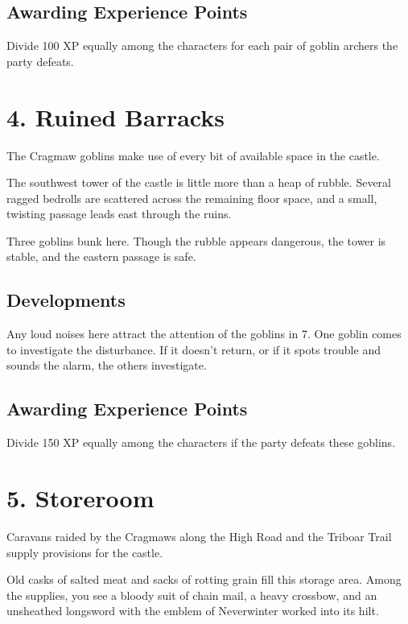\documentclass[10pt,a4paper,twoside,bg=print,twocolumn,openany,nodeprecatedcode]{dndbook}
\begin{document}
\subsection{Awarding Experience Points}
Divide 100 XP equally among the characters for each pair of goblin archers the party defeats.

\section{4. Ruined Barracks}
The Cragmaw goblins make use of every bit of available space in the castle.

\begin{DndReadAloud}{}
The southwest tower of the castle is little more than a heap of rubble. Several ragged bedrolls are scattered across the remaining floor space, and a small, twisting passage leads east through the ruins.

\end{DndReadAloud}

Three goblins bunk here. Though the rubble appears dangerous, the tower is stable, and the eastern passage is safe.

\subsection{Developments}
Any loud noises here attract the attention of the goblins in 7. One goblin comes to investigate the disturbance. If it doesn't return, or if it spots trouble and sounds the alarm, the others investigate.

\subsection{Awarding Experience Points}
Divide 150 XP equally among the characters if the party defeats these goblins.

\section{5. Storeroom}
Caravans raided by the Cragmaws along the High Road and the Triboar Trail supply provisions for the castle.

\begin{DndReadAloud}{}
Old casks of salted meat and sacks of rotting grain fill this storage area. Among the supplies, you see a bloody suit of chain mail, a heavy crossbow, and an unsheathed longsword with the emblem of Neverwinter worked into its hilt.

\end{DndReadAloud}
\end{document}
